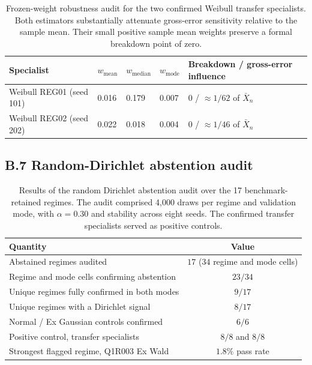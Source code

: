 \begin{table}[htbp]
\centering
\small
\caption{Frozen-weight robustness audit for the two confirmed Weibull transfer specialists. Both estimators substantially attenuate gross-error sensitivity relative to the sample mean. Their small positive sample mean weights preserve a formal breakdown point of zero.}
\label{tab:robustness_pub}
\begin{tabular}{@{}P{0.23\textwidth}P{0.11\textwidth}P{0.12\textwidth}P{0.11\textwidth}P{0.31\textwidth}@{}}
\toprule
\textbf{Specialist} & $w_{\text{mean}}$ & $w_{\text{median}}$ & $w_{\text{mode}}$ & \textbf{Breakdown / gross-error influence} \\
\midrule
Weibull REG01 (seed 101) & 0.016 & 0.179 & 0.007 & $0$ / $\approx 1/62$ of $\bar X_n$ \\
Weibull REG02 (seed 202) & 0.022 & 0.018 & 0.004 & $0$ / $\approx 1/46$ of $\bar X_n$ \\
\bottomrule
\end{tabular}
\end{table}

\subsection*{B.7 Random-Dirichlet abstention audit}

\begin{table}[htbp]
\centering
\small
\caption{Results of the random Dirichlet abstention audit over the 17 benchmark-retained regimes. The audit comprised 4,000 draws per regime and validation mode, with $\alpha=0.30$ and stability across eight seeds. The confirmed transfer specialists served as positive controls.}
\label{tab:abstain_audit}
\begin{tabular}{lc}
\toprule
\textbf{Quantity} & \textbf{Value} \\
\midrule
Abstained regimes audited & $17$ ($34$ regime and mode cells) \\
Regime and mode cells confirming abstention & $23 / 34$ \\
Unique regimes fully confirmed in both modes & $9 / 17$ \\
Unique regimes with a Dirichlet signal & $8 / 17$ \\
Normal / Ex Gaussian controls confirmed & $6 / 6$ \\
Positive control, transfer specialists & $8 / 8$ and $8 / 8$ \\
Strongest flagged regime, Q1R003 Ex Wald & $1.8\%$ pass rate \\
\bottomrule
\end{tabular}
\end{table}

